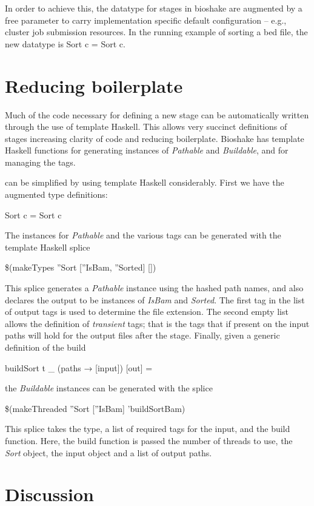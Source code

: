\documentclass{article}
\begin{document}
In order to achieve this, the datatype for stages in bioshake are augmented by a
free parameter to carry implementation specific default configuration -- e.g., cluster
job submission resources. In the running example of sorting a bed file, the new
datatype is \<  Sort c = Sort c\>.

\section{Reducing boilerplate}

Much of the code necessary for defining a new stage can be automatically written
through the use of template Haskell. This allows very succinct definitions of
stages increasing clarity of code and reducing boilerplate. Bioshake has
template Haskell functions for generating instances of \textit{Pathable} and
\textit{Buildable}, and for managing the tags.

\begin{example}
   can be simplified by using template Haskell considerably. First
  we have the augmented type definitions:
  \begin{haskell*}
     Sort c = Sort c
  \end{haskell*}
  The instances for \textit{Pathable} and the various tags can be generated with
  the template Haskell splice
  \begin{haskell*}
    \$(makeTypes ''\!Sort [''\!IsBam, ''\!Sorted] [])
  \end{haskell*}
  This splice generates a \textit{Pathable} instance using the hashed path
  names, and also declares the output to be instances of \textit{IsBam} and
  \textit{Sorted}. The first tag in the list of output tags is used to determine
  the file extension. The second empty list allows the definition of
  \textit{transient} tags; that is the tags that if present on the input paths will
  hold for the output files after the stage.
  Finally, given a generic definition of the build
  \begin{haskell*}
    buildSort t \_ (paths → [input]) [out] = 
  \end{haskell*}
  the \textit{Buildable} instances can be generated with the splice
  \begin{haskell*}
    \$(makeThreaded ''\!Sort [''\!IsBam] '\!buildSortBam)
  \end{haskell*}
  This splice takes the type, a list of required tags for the input, and the
  build function. Here, the build function is passed the number of threads to
  use, the \textit{Sort} object, the input object and a list of output paths.

\end{example}

\section{Discussion}
\end{document}
